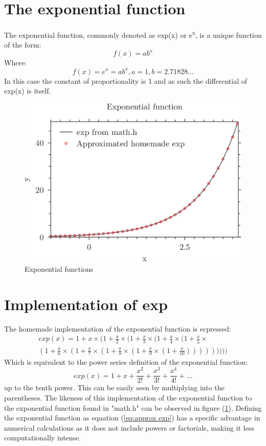 \documentclass[12pt,a4paper]{article}
\begin{document}
\section{The exponential function}
The exponential function, commonly denoted as exp(x) or e\textsuperscript{x}, is a unique function of the form: \begin{equation}\label{eq:exponential form}
  f(x)=ab^x
\end{equation}
Where:
\begin{equation}\label{eq:exponential function}
  f(x)=e^x=ab^x,  a=1,b=2.71828...
\end{equation}
In this case the constant of proportionality is 1 and as such the differential of exp(x) is itself.
\begin{figure}[h]
  \centering
  \label{fig:exp}
  \includegraphics{exp.pyxplot.png}
  \caption{Exponential functions}
\end{figure}
\section{Implementation of exp}
The homemade implementation of the exponential function is ecpressed:\begin{multline}
  \label{eq:approx exp}
  exp(x)=1+x\times(1+\frac{x}{2}\times(1+\frac{x}{3}\times(1+\frac{x}{4}\times(1+\frac{x}{5}\times\\ (1+\frac{x}{6}\times(1+\frac{x}{7}\times(1+\frac{x}{8}\times(1+\frac{x}{9}\times(1+\frac{x}{10})))))))))
\end{multline}
Which is equivalent to the power series definition of the exponential function:
\begin{equation}
  \label{exp def}
  exp(x)=1+x+\frac{x^2}{2!}+\frac{x^3}{3!}+\frac{x^4}{4!}+...
\end{equation}
up to the tenth power. This can be easily seen by multiplying into the parentheses. The likeness of this implementation of the exponential function to the exponential function found in "math.h" can be observed in figure (\ref{fig:exp}). Defining the exponential function as equation (\ref{eq:approx exp}) has a specific advantage in numerical calculations as it does not include powers or factorials, making it less computationally intense.
\end{document}
